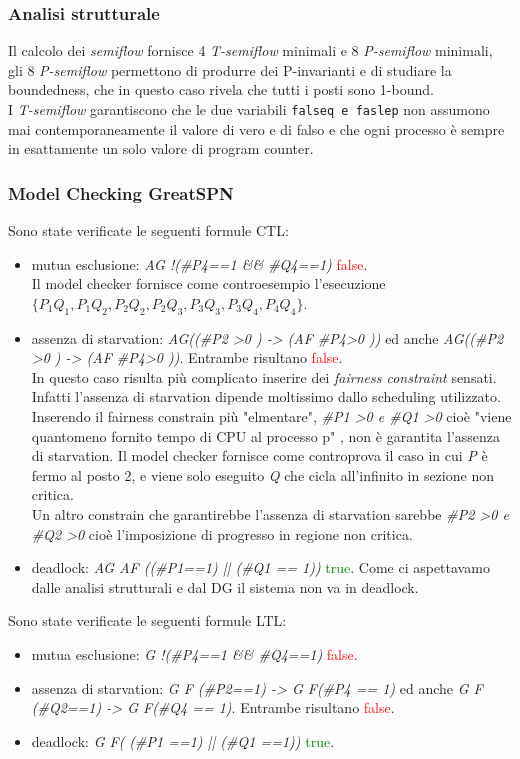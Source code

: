 \documentclass[a4paper]{article}
\begin{document}
\subsubsection{Analisi strutturale}
\label{SEC:3_8_strutturale}
Il calcolo dei \textit{semiflow} fornisce 4 \textit{T-semiflow} minimali e 8 \textit{P-semiflow} minimali, gli 8 \textit{P-semiflow} permettono di produrre dei P-invarianti e di studiare la boundedness, che in questo caso rivela che tutti i posti sono 1-bound.\\
I \textit{T-semiflow} garantiscono che le due variabili \texttt{falseq \texttt{e} faslep} non assumono mai contemporaneamente il valore di vero e di falso e che ogni processo è sempre in esattamente un solo valore di program counter.

\subsubsection{Model Checking GreatSPN}
Sono state verificate le seguenti formule CTL:
\begin{itemize}
	\item mutua esclusione: \textit{AG !(\#P4==1 \&\& \#Q4==1)} \textcolor{red}{false}.\\
		Il model checker fornisce come controesempio l'esecuzione \\$\{P_1 Q_1,P_1 Q_2,P_2 Q_2,P_2 Q_3,P_3 Q_3,P_3 Q_4,P_4 Q_4\}$.
	\item assenza di starvation: \textit{AG((\#P2 >0 ) -> (AF \#P4>0 ))} ed anche \textit{AG((\#P2 >0 ) -> (AF \#P4>0 ))}. Entrambe risultano \textcolor{red}{false}.\\
		In questo caso risulta più complicato inserire dei \textit{fairness constraint} sensati. Infatti l'assenza di starvation dipende moltissimo dallo scheduling utilizzato.  
		Inserendo il fairness constrain più "elmentare", \textit{\#P1 >0 \textit{e} \#Q1 >0} cioè "viene quantomeno fornito tempo di CPU al processo p" , non è garantita l'assenza di starvation. Il model checker fornisce come controprova il caso in cui \textit{P} è fermo al posto 2, e viene solo eseguito \textit{Q} che cicla all'infinito in sezione non critica.\\
		Un altro constrain che garantirebbe l'assenza di starvation sarebbe \textit{\#P2 >0 \textit{e} \#Q2 >0} cioè l'imposizione di progresso in regione non critica.%
	\item deadlock: \textit{AG AF ((\#P1==1) || (\#Q1 == 1))} \textcolor{green}{true}. Come ci aspettavamo dalle analisi strutturali e dal DG il sistema non va in deadlock.
\end{itemize}
Sono state verificate le seguenti formule LTL:
\begin{itemize}
	\item mutua esclusione: \textit{G !(\#P4==1 \&\& \#Q4==1)} \textcolor{red}{false}.
	\item assenza di starvation: \textit{G F (\#P2==1) -> G F(\#P4 == 1)} ed anche \textit{G F (\#Q2==1) -> G F(\#Q4 == 1)}. Entrambe risultano \textcolor{red}{false}.
	\item deadlock: \textit{G F( (\#P1 ==1) ||  (\#Q1 ==1))} \textcolor{green}{true}.
\end{itemize}
\end{document}
